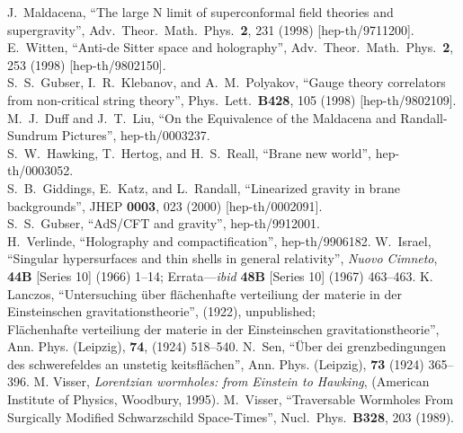 \documentclass[a4paper,12pt]{article}
\begin{document}
\begin{thebibliography}{99}
J.~Maldacena,
``The large N limit of superconformal field theories and supergravity'',
Adv.\ Theor.\ Math.\ Phys.\  {\bf 2}, 231 (1998)
[hep-th/9711200].
\\
E.~Witten,
``Anti-de Sitter space and holography'',
Adv.\ Theor.\ Math.\ Phys.\  {\bf 2}, 253 (1998)
[hep-th/9802150].
\\
S.~S.~Gubser, I.~R.~Klebanov, and A.~M.~Polyakov,
``Gauge theory correlators from non-critical string theory'',
Phys.\ Lett.\  {\bf B428}, 105 (1998)
[hep-th/9802109].
M.~J.~Duff and J.~T.~Liu,
``On the Equivalence of the Maldacena and Randall-Sundrum Pictures'',
hep-th/0003237.
\\
S.~W.~Hawking, T.~Hertog, and H.~S.~Reall,
``Brane new world'',
hep-th/0003052.
\\
S.~B.~Giddings, E.~Katz, and L.~Randall,
``Linearized gravity in brane backgrounds'',
JHEP {\bf 0003}, 023 (2000)
[hep-th/0002091].
\\
S.~S.~Gubser,
``AdS/CFT and gravity'',
hep-th/9912001.
\\
H.~Verlinde,
``Holography and compactification'',
hep-th/9906182.
W.~Israel,
``Singular hypersurfaces and thin shells in general relativity'',
{\em Nuovo Cimneto}, {\bf 44B} [Series 10] (1966) 1--14; 
Errata---{\em ibid} {\bf 48B} [Series 10] (1967) 463--463.
K. Lanczos,
``Untersuching \"uber fl\"achenhafte verteiliung der materie in der 
Einsteinschen gravitationstheorie'', (1922), unpublished;
\\
Fl\"achenhafte verteiliung der materie in der Einsteinschen gravitationstheorie'', 
Ann. Phys. (Leipzig), {\bf 74}, (1924) 518--540.
N.~Sen, 
``\"Uber dei grenzbedingungen des schwerefeldes an unstetig keitsfl\"achen'',
Ann. Phys. (Leipzig), {\bf 73} (1924) 365--396.
M. Visser, 
{\em Lorentzian wormholes: from Einstein to Hawking},
(American Institute of Physics, Woodbury, 1995). 
M.~Visser,
``Traversable Wormholes From Surgically Modified Schwarzschild Space-Times'',
Nucl.\ Phys.\  {\bf B328}, 203 (1989).

\end{thebibliography}
\end{document}

